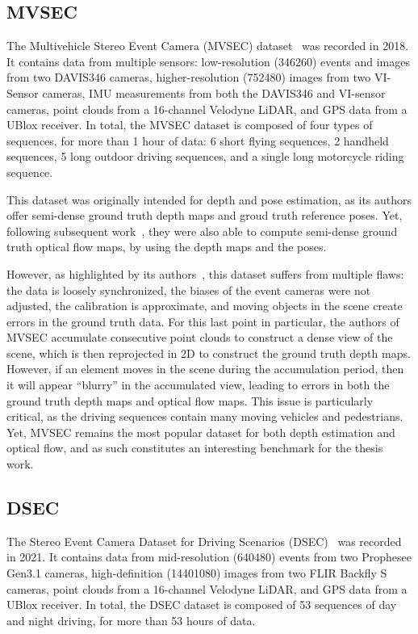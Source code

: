 \subsection{MVSEC}\label{sec:evtcams:datasets:mvsec}
The Multivehicle Stereo Event Camera (MVSEC) dataset~\cite{Zhu2018TheMS} was recorded in 2018. It contains data from multiple sensors: low-resolution (346\texttimes{}260) events and images from two DAVIS346 cameras, higher-resolution (752\texttimes{}480) images from two VI-Sensor cameras, IMU measurements from both the DAVIS346 and VI-sensor cameras, point clouds from a 16-channel Velodyne LiDAR, and GPS data from a UBlox receiver. In total, the MVSEC dataset is composed of four types of sequences, for more than 1 hour of data: 6 short flying sequences, 2 handheld sequences, 5 long outdoor driving sequences, and a single long motorcycle riding sequence.

This dataset was originally intended for depth and pose estimation, as its authors offer semi-dense ground truth depth maps and groud truth reference poses. Yet, following subsequent work~\cite{Zhu2018EVFlowNetSO}, they were also able to compute semi-dense ground truth optical flow maps, by using the depth maps and the poses.

However, as highlighted by its authors~\cite{Zhu2018TheMS}, this dataset suffers from multiple flaws: the data is loosely synchronized, the biases of the event cameras were not adjusted, the calibration is approximate, and moving objects in the scene create errors in the ground truth data. For this last point in particular, the authors of MVSEC accumulate consecutive point clouds to construct a dense view of the scene, which is then reprojected in 2D to construct the ground truth depth maps. However, if an element moves in the scene during the accumulation period, then it will appear ``blurry'' in the accumulated view, leading to errors in both the ground truth depth maps and optical flow maps. This issue is particularly critical, as the driving sequences contain many moving vehicles and pedestrians. Yet, MVSEC remains the most popular dataset for both depth estimation and optical flow, and as such constitutes an interesting benchmark for the thesis work.

\subsection{DSEC}
The Stereo Event Camera Dataset for Driving Scenarios (DSEC)~\cite{Gehrig2021DSECAS} was recorded in 2021. It contains data from mid-resolution (640\texttimes{}480) events from two Prophesee Gen3.1 cameras, high-definition (1440\texttimes{}1080) images from two FLIR Backfly S cameras, point clouds from a 16-channel Velodyne LiDAR, and GPS data from a UBlox receiver. In total, the DSEC dataset is composed of 53 sequences of day and night driving, for more than 53 hours of data.


